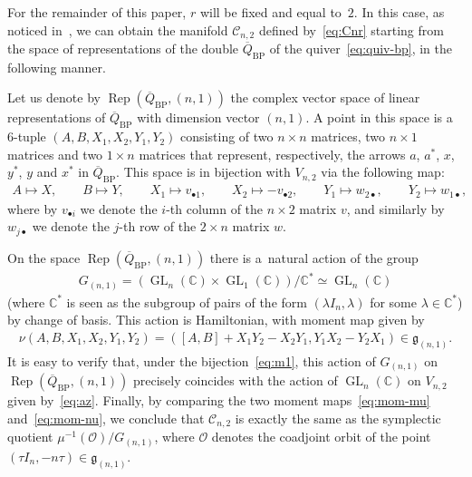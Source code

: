 \documentclass[11pt]{article}
\newcommand{\bb}[1]{\mathbb{#1}}
\newcommand{\ol}[1]{\overline{#1}}
\DeclareMathOperator{\GL}{GL}
\DeclareMathOperator{\Rep}{Rep}
\begin{document}
For the remainder of this paper, \(r\) will be f\/ixed and equal to~\(2\).
In this case, as noticed in~\cite{bp08}, we can obtain the manifold \(\mathcal{C}_{n,2}\) def\/ined
by~\eqref{eq:Cnr} starting from the space of representations of the double \(\ol{Q}_{\mathrm{BP}}\) of the
quiver~\eqref{eq:quiv-bp}, in the following manner.

Let us denote by \(\Rep(\ol{Q}_{\mathrm{BP}},(n,1))\) the complex vector space of linear representations of
\(\ol{Q}_{\mathrm{BP}}\) with dimension vector \((n,1)\).
A point in this space is a~\(6\)-tuple \((A,B,X_{1},X_{2},Y_{1},Y_{2})\) consisting of two \(n\times n\)
matrices, two \(n\times 1\) matrices and two \(1\times n\) matrices that represent, respectively, the
arrows \(a\), \(a^{*}\), \(x\), \(y^{*}\), \(y\) and \(x^{*}\) in \(\ol{Q}_{\mathrm{BP}}\).
This space is in bijection with \(V_{n,2}\) via the following map:
\begin{gather}
\label{eq:m1}
A\mapsto X,
\qquad
B\mapsto Y,
\qquad
X_{1}\mapsto v_{\bullet1},
\qquad
X_{2}\mapsto-v_{\bullet2},
\qquad
Y_{1}\mapsto w_{2\bullet},
\qquad
Y_{2}\mapsto w_{1\bullet},
\end{gather}
where by \(v_{\bullet i}\) we denote the \(i\)-th column of the \(n\times 2\) matrix \(v\), and similarly
by \(w_{j\bullet}\) we denote the \(j\)-th row of the \(2\times n\) matrix \(w\).

On the space \(\Rep(\ol{Q}_{\mathrm{BP}},(n,1))\) there is a~natural action of the group
\begin{gather*}
G_{(n,1)}=(\GL_{n}(\bb{C})\times\GL_{1}(\bb{C}))/\bb{C}^{*}\simeq\GL_{n}(\bb{C})
\end{gather*}
(where \(\bb{C}^{*}\) is seen as the subgroup of pairs of the form \((\lambda I_{n},\lambda)\) for some
\(\lambda\in \bb{C}^{*}\)) by change of basis.
This action is Hamiltonian, with moment map given by
\begin{gather}
\label{eq:mom-nu}
\nu(A,B,X_{1},X_{2},Y_{1},Y_{2})=([A,B]+X_{1}Y_{2}-X_{2}Y_{1},Y_{1}X_{2}-Y_{2}X_{1})\in\mathfrak{g}_{(n,1)}.
\end{gather}
It is easy to verify that, under the bijection~\eqref{eq:m1}, this action of \(G_{(n,1)}\) on
\(\Rep(\ol{Q}_{\mathrm{BP}},(n,1))\) precisely coincides with the action of \(\GL_{n}(\bb{C})\) on
\(V_{n,2}\) given by~\eqref{eq:az}.
Finally, by comparing the two moment maps~\eqref{eq:mom-mu} and~\eqref{eq:mom-nu}, we conclude that
\(\mathcal{C}_{n,2}\) is exactly the same as the symplectic quotient \(\mu^{-1}(\mathcal{O})/G_{(n,1)}\),
where \(\mathcal{O}\) denotes the coadjoint orbit of the point \((\tau I_{n}, -n\tau)\in
\mathfrak{g}_{(n,1)}\).
\end{document}
